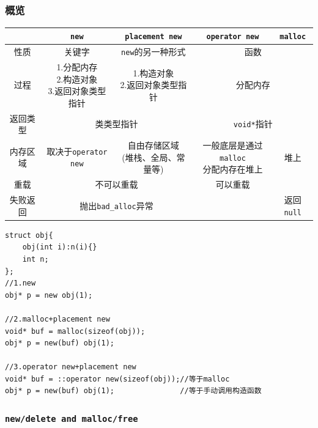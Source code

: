 \subsection{\color{purple}{内存分配}}
\subsubsection{概览}
\begin{center}
	\begin{tabular}[h]{|c|c|c|c|c|}
		\hline
		~&{\tt new}&{\tt placement new}&{\tt operator new}&{\tt malloc}\\
		\hline
		性质&关键字&{\tt new}的另一种形式&\multicolumn{2}{|c|}{函数}\\
		\hline
		过程&\makecell[c]{1.分配内存\\2.构造对象\\3.返回对象类型指针}&
			\makecell[c]{1.构造对象\\2.返回对象类型指针}&\multicolumn{2}{|c|}{分配内存}\\
		\hline
		返回类型&\multicolumn{2}{|c|}{类类型指针}&\multicolumn{2}{|c|}{{\tt void*}指针}\\
		\hline
		内存区域&取决于{\tt operator new}&
			\makecell[c]{自由存储区域\\(堆栈、全局、常量等)}&\makecell[c]{一般底层是通过{\tt malloc}\\分配内存在堆上}&堆上\\
		\hline
		重载&\multicolumn{2}{|c|}{不可以重载}&可以重载&\\
		\hline
		失败返回&\multicolumn{2}{|c|}{抛出{\tt bad\_alloc}异常}& &返回{\tt null}\\
		\hline
	\end{tabular}
\end{center}
\begin{lstlisting}[title=三种创建堆上对象方法]
struct obj{ 
	obj(int i):n(i){}
	int n;
};
//1.new
obj* p = new obj(1);

//2.malloc+placement new
void* buf = malloc(sizeof(obj));
obj* p = new(buf) obj(1);

//3.operator new+placement new
void* buf = ::operator new(sizeof(obj));//等于malloc
obj* p = new(buf) obj(1);               //等于手动调用构造函数
\end{lstlisting}
\subsubsection{\tt new/delete and malloc/free}

